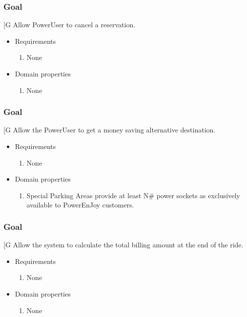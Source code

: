    \subsubsection{Goal }
    {[}G\arabic{goalctr}{]}
    Allow PowerUser to cancel a reservation.
    \begin{itemize}
        \item Requirements
        \begin{enumerate}[REQ]
    			\item None
        \end{enumerate}
        \item Domain properties
        \begin{enumerate}[PRO]
    			\item None
        \end{enumerate}
    \end{itemize}
 
    \subsubsection{Goal }
    {[}G\arabic{goalctr}{]}
    Allow the PowerUser to get a money saving alternative destination.
    \begin{itemize}
        \item Requirements
        \begin{enumerate}[REQ]
    			\item None
        \end{enumerate}
        \item Domain properties
        \begin{enumerate}[PRO]
    			\item Special Parking Areas provide at least N\# power sockets as exclusively available to PowerEnJoy customers.
        \end{enumerate}
    \end{itemize}
 
    \subsubsection{Goal }
    {[}G\arabic{goalctr}{]}
    Allow the system to calculate the total billing amount at the end of the ride.
    \begin{itemize}
        \item Requirements
        \begin{enumerate}[REQ]
    			\item None
        \end{enumerate}
        \item Domain properties
        \begin{enumerate}[PRO]
    			\item None
        \end{enumerate}
    \end{itemize}
 
